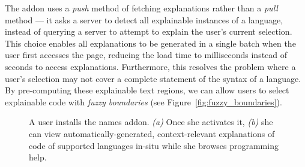 The addon uses a \emph{push} method of fetching explanations rather than a \emph{pull} method --- it asks a server to detect all explainable instances of a language, instead of querying a server to attempt to explain the user's current selection.
This choice enables all explanations to be generated in a single batch when the user first accesses the page, reducing the load time to milliseconds instead of seconds to access explanations.
Furthermore, this resolves the problem where a user's selection may not cover a complete statement of the syntax of a language.
By pre-computing these explainable text regions, we can allow users to select explainable code with \emph{fuzzy boundaries} (see Figure~\ref{fig:fuzzy_boundaries}).

\begin{figure}
    \centering
    \label{fig:browser_tutorons_markup}
    \caption{A user installs the \Glspl{name} addon.  \emph{(a)} Once she activates it, \emph{(b)} she can view automatically-generated, context-relevant explanations of code of supported languages in-situ while she browses programming help.}
\end{figure}

\begin{figure}
\end{figure}

